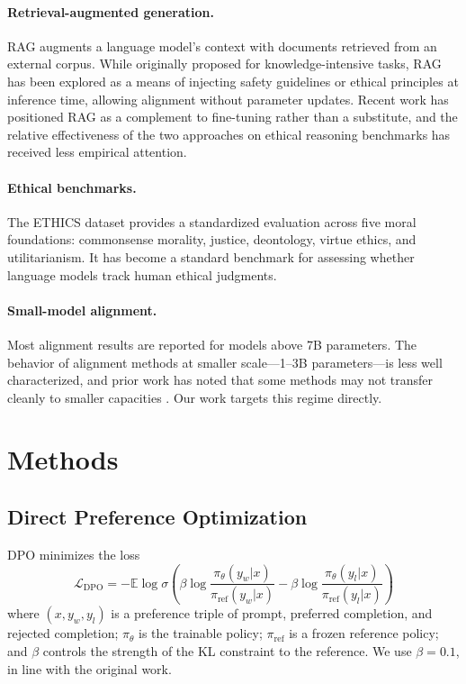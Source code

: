 \paragraph{Retrieval-augmented generation.} RAG \citep{lewis2020rag} augments a language model's context with documents retrieved from an external corpus. While originally proposed for knowledge-intensive tasks, RAG has been explored as a means of injecting safety guidelines or ethical principles at inference time, allowing alignment without parameter updates. Recent work has positioned RAG as a complement to fine-tuning rather than a substitute, and the relative effectiveness of the two approaches on ethical reasoning benchmarks has received less empirical attention.

\paragraph{Ethical benchmarks.} The ETHICS dataset \citep{hendrycks2021ethics} provides a standardized evaluation across five moral foundations: commonsense morality, justice, deontology, virtue ethics, and utilitarianism. It has become a standard benchmark for assessing whether language models track human ethical judgments.

\paragraph{Small-model alignment.} Most alignment results are reported for models above 7B parameters. The behavior of alignment methods at smaller scale—1--3B parameters—is less well characterized, and prior work has noted that some methods may not transfer cleanly to smaller capacities \citep{xu2024dpo_failures}. Our work targets this regime directly.

\section{Methods}

\subsection{Direct Preference Optimization}
DPO \citep{rafailov2023dpo} minimizes the loss
\begin{equation*}
\mathcal{L}_{\text{DPO}} = -\mathbb{E} \log \sigma \left( \beta \log \frac{\pi_\theta(y_w|x)}{\pi_{\text{ref}}(y_w|x)} - \beta \log \frac{\pi_\theta(y_l|x)}{\pi_{\text{ref}}(y_l|x)} \right)
\end{equation*}
where $(x, y_w, y_l)$ is a preference triple of prompt, preferred completion, and rejected completion; $\pi_\theta$ is the trainable policy; $\pi_{\text{ref}}$ is a frozen reference policy; and $\beta$ controls the strength of the KL constraint to the reference. We use $\beta = 0.1$, in line with the original work.

